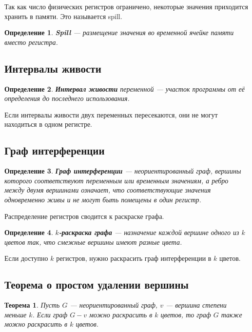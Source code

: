 \documentclass[12pt,a4paper]{article}
\newtheorem{definition}{Определение}
\newtheorem{theorem}{Теорема}
\begin{document}
Так как число физических регистров ограничено, некоторые значения приходится хранить в памяти. Это называется spill.

\begin{definition}
\textbf{Spill} --- размещение значения во временной ячейке памяти вместо регистра.
\end{definition}

\subsection{Интервалы живости}

\begin{definition}
\textbf{Интервал живости} переменной --- участок программы от её определения до последнего использования.
\end{definition}

Если интервалы живости двух переменных пересекаются, они не могут находиться в одном регистре.

\subsection{Граф интерференции}

\begin{definition}
\textbf{Граф интерференции} --- неориентированный граф, вершины которого соответствуют переменным или временным значениям, а ребро между двумя вершинами означает, что соответствующие значения одновременно живы и не могут быть помещены в один регистр.
\end{definition}

Распределение регистров сводится к раскраске графа.

\begin{definition}
\textbf{$k$-раскраска графа} --- назначение каждой вершине одного из $k$ цветов так, что смежные вершины имеют разные цвета.
\end{definition}

Если доступно $k$ регистров, нужно раскрасить граф интерференции в $k$ цветов.

\subsection{Теорема о простом удалении вершины}

\begin{theorem}
Пусть $G$ --- неориентированный граф, $v$ --- вершина степени меньше $k$.
Если граф $G-v$ можно раскрасить в $k$ цветов, то граф $G$ также можно раскрасить в $k$ цветов.
\end{theorem}
\end{document}
